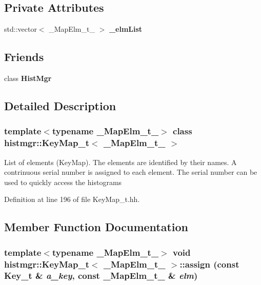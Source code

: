 \subsection*{Private Attributes}
\begin{DoxyCompactItemize}
\item 
std::vector$<$ \_\-MapElm\_\-t\_\- $>$ {\bfseries \_\-elmList}\label{classhistmgr_1_1KeyMap__t_a76efa9a3eceb29a7e669629d6f22538d}

\end{DoxyCompactItemize}
\subsection*{Friends}
\begin{DoxyCompactItemize}
\item 
class {\bfseries HistMgr}\label{classhistmgr_1_1KeyMap__t_a3cc85db784d7651390e41024125eb3a0}

\end{DoxyCompactItemize}


\subsection{Detailed Description}
\subsubsection*{template$<$typename \_\-MapElm\_\-t\_\-$>$ class histmgr::KeyMap\_\-t$<$ \_\-MapElm\_\-t\_\- $>$}

List of elements (KeyMap). The elements are identified by their names. A contrinuous serial number is assigned to each element. The serial number can be used to quickly access the histograms 

Definition at line 196 of file KeyMap\_\-t.hh.

\subsection{Member Function Documentation}
\subsubsection[{assign}]{\setlength{\rightskip}{0pt plus 5cm}template$<$typename \_\-MapElm\_\-t\_\-$>$ void {\bf histmgr::KeyMap\_\-t}$<$ \_\-MapElm\_\-t\_\- $>$::assign (const {\bf Key\_\-t} \& {\em a\_\-key}, \/  const \_\-MapElm\_\-t\_\- \& {\em elm})\hspace{0.3cm}{\ttfamily  [inline]}}\label{classhistmgr_1_1KeyMap__t_a3c2c47af4647caeb9b5712f90f4d7410}


